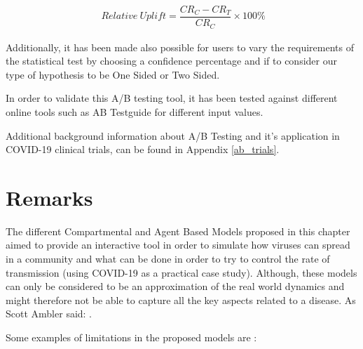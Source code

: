 \useshortskip
\begin{align}
\ Relative\:Uplift = \dfrac{CR_{C} - CR_{T}}{CR_{C}}\times100\%
\label{uplift}
\end{align}
\useshortskip

Additionally, it has been made also possible for users to vary the requirements of the statistical test by choosing a confidence percentage and if to consider our type of hypothesis to be One Sided or Two Sided. 

In order to validate this A/B testing tool, it has been tested against different online tools such as AB Testguide \cite{check_live} for different input values.

Additional background information about A/B Testing and it's application in COVID-19 clinical trials, can be found in Appendix \ref{ab_trials}.

\section{Remarks}
The different Compartmental and Agent Based Models proposed in this chapter aimed to provide an interactive tool in order to simulate how viruses can spread in a community and what can be done in order to try to control the rate of transmission (using COVID-19 as a practical case study). Although, these models can only be considered to be an approximation of the real world dynamics and might therefore not be able to capture all the key aspects related to a disease. As Scott Ambler \cite{scott} said: .

Some examples of limitations in the proposed models are \cite{sri_ex}:

